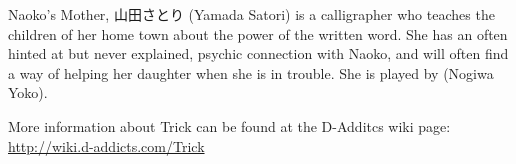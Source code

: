 \par Naoko's Mother, 山田さとり (Yamada Satori) is a calligrapher who teaches the children of her home town about the power of the written word. She has an often hinted at but never explained, psychic connection with Naoko, and will often find a way of helping her daughter when she is in trouble. She is played by  (Nogiwa Yoko).

\par More information about Trick can be found at the D-Additcs wiki page: \url{http://wiki.d-addicts.com/Trick}

\theendnotes